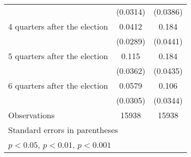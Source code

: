 \begin{table}[htbp]
\begin{tabular}{l*{2}{c}}
                    &    (0.0314)         &    (0.0386)         \\
[1em]
 4 quarters after the election&      0.0412         &       0.184\sym{***}\\
                    &    (0.0289)         &    (0.0441)         \\
[1em]
 5 quarters after the election&       0.115\sym{**} &       0.184\sym{***}\\
                    &    (0.0362)         &    (0.0435)         \\
[1em]
 6 quarters after the election&      0.0579         &       0.106\sym{**} \\
                    &    (0.0305)         &    (0.0344)         \\
\hline
Observations        &       15938         &       15938         \\
\hline\hline
\multicolumn{3}{l}{\footnotesize Standard errors in parentheses}\\
\multicolumn{3}{l}{\footnotesize \sym{*} \(p<0.05\), \sym{**} \(p<0.01\), \sym{***} \(p<0.001\)}\\
\end{tabular}
\end{table}
